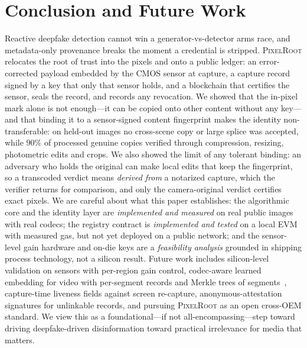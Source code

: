 \documentclass[journal]{IEEEtran}
\newcommand{\pr}{\textup{\textsc{PixelRoot}}}
\begin{document}
\section{Conclusion and Future Work}\label{sec:conclusion}
Reactive deepfake detection cannot win a generator-vs-detector arms race, and
metadata-only provenance breaks the moment a credential is stripped. \pr{}
relocates the root of trust into the pixels and onto a public ledger: an
error-corrected payload embedded by the CMOS sensor at capture, a capture record
signed by a key that only that sensor holds, and a blockchain that certifies the
sensor, seals the record, and records any revocation. We showed that the
in-pixel mark alone is not enough---it can be copied onto other content without
any key---and that binding it to a sensor-signed content fingerprint makes the
identity non-transferable: on held-out images no cross-scene copy or large splice
was accepted, while $90\%$ of processed genuine copies verified through
compression, resizing, photometric edits and crops. We also showed the limit of
any tolerant binding: an adversary who holds the original can make local edits
that keep the fingerprint, so a transcoded verdict means \emph{derived from}
a notarized capture, which the verifier returns for comparison, and only the
camera-original verdict certifies exact pixels. We are careful about what this paper establishes: the
algorithmic core and the identity layer are \emph{implemented and measured} on
real public images with real codecs; the registry contract is \emph{implemented
and tested} on a local EVM with measured gas, but not yet deployed on a public
network; and the sensor-level gain hardware and on-die keys are a
\emph{feasibility analysis} grounded in shipping process technology, not a
silicon result. Future work includes
silicon-level validation on sensors with per-region gain control, codec-aware
learned embedding for video with per-segment records and Merkle trees of
segments~\cite{cstfmark2026}, capture-time liveness fields against screen
re-capture, anonymous-attestation signatures for unlinkable records, and pursuing
\pr{} as an open cross-OEM standard. We view this as a foundational---if not
all-encompassing---step toward driving deepfake-driven disinformation toward
practical irrelevance for media that matters.

\end{document}
